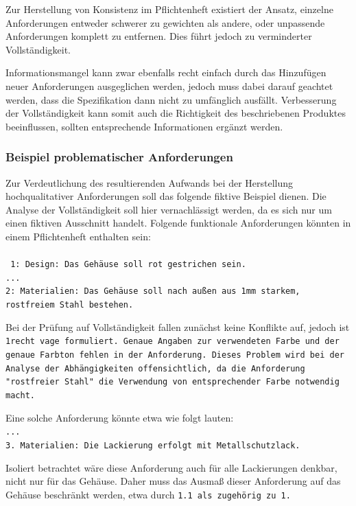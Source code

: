 \documentclass[12pt]{report}
\begin{document}
Zur Herstellung von Konsistenz im Pflichtenheft existiert der Ansatz, einzelne Anforderungen entweder schwerer zu gewichten als andere, oder unpassende Anforderungen komplett zu entfernen. Dies führt jedoch zu verminderter Vollständigkeit. 

Informationsmangel kann zwar ebenfalls recht einfach durch das Hinzufügen neuer Anforderungen ausgeglichen werden, jedoch muss dabei darauf geachtet werden, dass die Spezifikation dann nicht zu umfänglich ausfällt. Verbesserung der Vollständigkeit kann somit auch die Richtigkeit des beschriebenen Produktes beeinflussen, sollten entsprechende Informationen ergänzt werden.

\subsubsection{Beispiel problematischer Anforderungen}
Zur Verdeutlichung des resultierenden Aufwands bei der Herstellung hochqualitativer Anforderungen soll das folgende fiktive Beispiel dienen. Die Analyse der Vollständigkeit soll hier vernachlässigt werden, da es sich nur um einen fiktiven Ausschnitt handelt. Folgende funktionale Anforderungen könnten in einem Pflichtenheft enthalten sein:
\\
\\ \tt
1: Design: Das Gehäuse soll rot gestrichen sein.\\
...\\
2: Materialien: Das Gehäuse soll nach außen aus 1mm starkem, \\rostfreiem Stahl bestehen.\\
\rm

Bei der Prüfung auf Vollständigkeit fallen zunächst keine Konflikte auf, jedoch ist \tt 1\rm recht vage formuliert. Genaue Angaben zur verwendeten Farbe und der genaue Farbton fehlen in der Anforderung. Dieses Problem wird bei der Analyse der Abhängigkeiten offensichtlich, da die Anforderung "rostfreier Stahl" die Verwendung von entsprechender Farbe notwendig macht. 

Eine solche Anforderung könnte etwa wie folgt lauten:
\\
\tt ...\\
3. Materialien: Die Lackierung erfolgt mit Metallschutzlack.\\
\rm

Isoliert betrachtet wäre diese Anforderung auch für alle Lackierungen denkbar, nicht nur für das Gehäuse. Daher muss das Ausmaß dieser Anforderung auf das Gehäuse beschränkt werden, etwa durch \tt 1.1 \rm als zugehörig zu \tt 1\rm.
\end{document}
